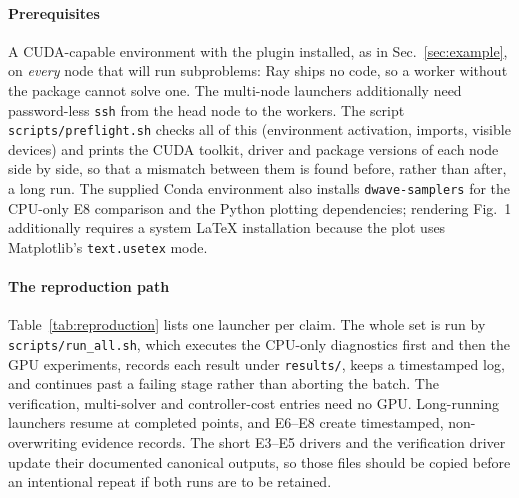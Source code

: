 \documentclass[preprint,12pt,a4paper]{elsarticle}
\begin{document}
\paragraph{Prerequisites}
A CUDA-capable environment with the plugin installed, as in
Sec.~\ref{sec:example}, on \emph{every} node that will run subproblems: Ray
ships no code, so a worker without the package cannot solve one. The
multi-node launchers additionally need password-less \texttt{ssh} from the head
node to the workers. The script \texttt{scripts/preflight.sh} checks all of
this (environment activation, imports, visible devices) and prints the CUDA
toolkit, driver and package versions of each node side by side, so that a
mismatch between them is found before, rather than after, a long run.
The supplied Conda environment also installs \texttt{dwave-samplers} for the CPU-only E8
comparison and the Python plotting dependencies; rendering Fig.~1 additionally requires a
system \LaTeX{} installation because the plot uses Matplotlib's \texttt{text.usetex} mode.

\paragraph{The reproduction path}
Table~\ref{tab:reproduction} lists one launcher per claim. The whole set is run
by \texttt{scripts/run\_all.sh}, which executes the CPU-only diagnostics first and then the
GPU experiments, records
each result under \texttt{results/}, keeps a timestamped log, and continues past
a failing stage rather than aborting the batch. The verification, multi-solver
and controller-cost entries need no GPU. Long-running launchers resume at completed points,
and E6--E8 create timestamped, non-overwriting evidence records. The short E3--E5 drivers and
the verification driver update their documented canonical outputs, so those files should be
copied before an intentional repeat if both runs are to be retained.
\end{document}
